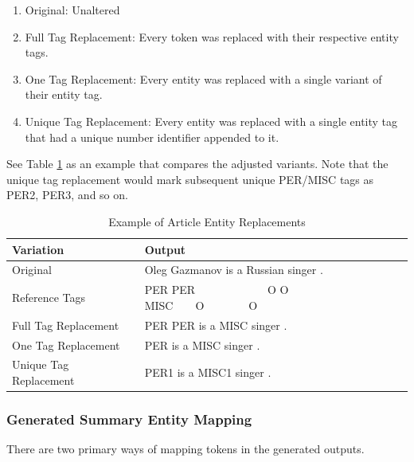 \documentclass[12pt]{report}
\begin{document}
            \begin{enumerate}
                \item Original: Unaltered
                \item Full Tag Replacement: Every token was replaced with their respective entity tags.
                \item One Tag Replacement: Every entity was replaced with a single variant of their entity tag.
                \item Unique Tag Replacement: Every entity was replaced with a single entity tag that had a unique number identifier appended to it.
            \end{enumerate}
            
            See Table \ref{tab:tag_vars} as an example that compares the adjusted variants. Note that the unique tag replacement would mark subsequent unique PER/MISC tags as PER2, PER3, and so on.
            
            \begin{table}[H]
            \begin{center}
            \begin{tabular}{|l|p{8cm}|}\hline
                
                \textbf{Variation} & \textbf{Output}\\\hline
                
                Original & Oleg Gazmanov is a Russian singer .\\\hline
                Reference Tags & PER PER\ \ \ \ \ \ \ \ \ \ \ \ \ O O MISC\ \ \ \ O\ \ \ \ \ \ \ \  O \\\hline
                Full Tag Replacement & PER PER is a MISC singer .\\\hline
                One Tag Replacement & PER is a MISC singer .\\\hline
                Unique Tag Replacement & PER1 is a MISC1 singer .\\\hline
                
            
            \end{tabular}
            \end{center}
            \caption{Example of Article Entity Replacements}
            \label{tab:tag_vars}
            \end{table}
            
            \subsubsection{Generated Summary Entity Mapping}
            There are two primary ways of mapping tokens in the generated outputs.
            
\end{document}
